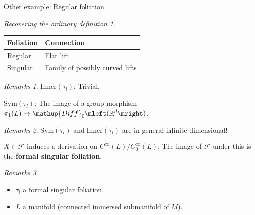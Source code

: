 \documentclass[hyperref={pdfpagelabels=false}]{beamer}
\theoremstyle{plain}
\theoremstyle{remark}
\newtheorem*{remark}{Remarks}
\newtheorem*{BackToTheRoots}{Recovering the ordinary definition}
\begin{document}
{

\begin{frame}{Other example: Regular foliation}
\begin{figure}
\end{figure}

\begin{BackToTheRoots}
	\centering
		\begin{tabular}{l|l}
			Foliation & Connection \\ \hline
			Regular & Flat lift \\
			Singular & Family of possibly curved lifts
		\end{tabular}
\end{BackToTheRoots}

\begin{remark}
$\mathup{Inner}(\tau_l)$: Trivial.

$\mathup{Sym}(\tau_l)$: The image of a group morphism $\pi_1(L) \to \mathup{Diff}_0\mleft( \mathbb{R}^d \mright)$.
\end{remark}
\end{frame}

\begin{frame}
\begin{remark}
$\mathup{Sym}(\tau_l)$ and $\mathup{Inner}(\tau_l)$ are in general infinite-dimensional! 
\end{remark}

\begin{definition}
$X \in \mathcal{F}$ induces a derivation on $C^\infty(L)/C^\infty_0(L)$. The image of $\mathcal{F}$ under this is the \textbf{formal singular foliation}.
\end{definition}

\begin{remark}
\begin{itemize}
	\item $\tau_l$ a formal singular foliation.
	\item $L$ a manifold (connected immersed submanifold of $M$).
\end{itemize}
\end{remark}
\end{frame}

}
\end{document}
